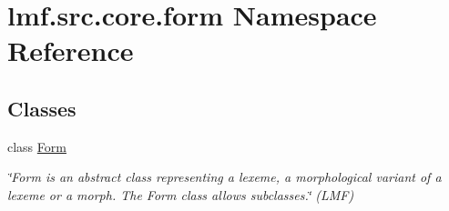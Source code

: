 \hypertarget{namespacelmf_1_1src_1_1core_1_1form}{\section{lmf.\+src.\+core.\+form Namespace Reference}
\label{namespacelmf_1_1src_1_1core_1_1form}
}
\subsection*{Classes}
\begin{DoxyCompactItemize}
\item 
class \hyperlink{classlmf_1_1src_1_1core_1_1form_1_1_form}{Form}
\begin{DoxyCompactList}\small\item\em \char`\"{}\+Form is an abstract class representing a lexeme, a morphological variant of a lexeme or a morph. The Form class allows subclasses.\char`\"{} (L\+M\+F) \end{DoxyCompactList}\end{DoxyCompactItemize}
